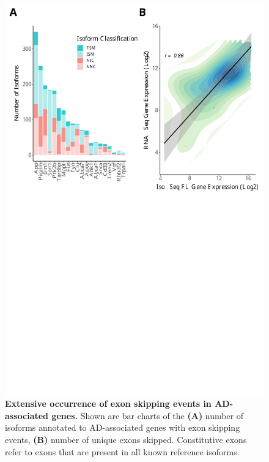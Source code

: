 \begin{figure}[]
	\centering
	\includegraphics[page=6,trim={0 20cm 0 0cm},clip,scale = 0.55]{Figures/ONTvsIsoSeq.pdf}
	\captionsetup{width=0.95\textwidth}
	\caption[Characterisation of exon skipping events in AD-associated genes]%
	{\textbf{Extensive occurrence of exon skipping events in AD-associated genes.} Shown are bar charts of the \textbf{(A)} number of isoforms annotated to AD-associated genes with exon skipping events, \textbf{(B)} number of unique exons skipped. Constitutive exons refer to exons that are present in all known reference isoforms.}
	\label{fig:ES_targeted}
\end{figure}

